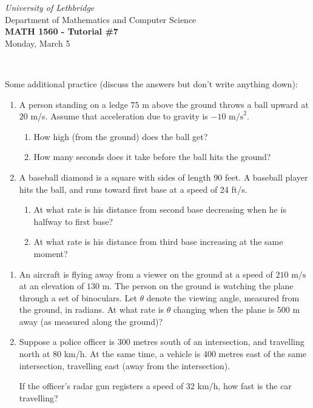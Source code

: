 \documentclass[12pt]{article}
\newcommand{\skipline}{\vspace{12pt}}
\begin{document}
\author{Instructor: Sean Fitzpatrick}
\thispagestyle{empty}
\begin{center}
\emph{University of Lethbridge}\\
Department of Mathematics and Computer Science\\
{\bf MATH 1560 - Tutorial \#7}\\
Monday, March 5
\end{center}
\skipline \ \noindent \skipline

\vspace*{\fill}


Some additional practice (discuss the answers but don't write anything down):
\begin{enumerate}
\item A person standing on a ledge $75$ m above the ground throws a ball upward at $20$ m/s. Assume that acceleration due to gravity is $-10\text{ m/s}^2$.
\begin{enumerate}
\item How high (from the ground) does the ball get?
\item How many seconds does it take before the ball hits the ground?
\end{enumerate}
\item A baseball diamond is a square with sides of length 90 feet. A baseball player hits the ball, and runs toward first base at a speed of 24 ft/s. 
\begin{enumerate}
\item At what rate is his distance from second base decreasing when he is halfway to first base?
\item At what rate is his distance from third base increasing at the same moment?
\end{enumerate}
\end{enumerate}




\newpage


\begin{enumerate}
\item An aircraft is flying away from a viewer on the ground at a speed of $210 \text{ m/s}$ at an elevation of $130 \text{ m}$. The person on the ground is watching the plane through a set of binoculars. Let $\theta$ denote the viewing angle, measured from the ground, in radians. At what rate is $\theta$ changing when the plane is $500 \text{ m}$ away (as measured along the ground)?

\vspace{3.5in}

\item Suppose a police officer is 300 metres south of an intersection, and travelling north at 80 km/h. At the same time, a vehicle is 400 metres east of the same intersection, travelling east (away from the intersection). 

If the officer's radar gun registers a speed of 32 km/h, how fast is the car travelling?

\end{enumerate}
\end{document}
